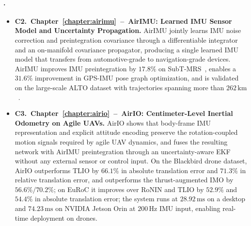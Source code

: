 \paragraph{\partIITitle.}
\begin{itemize}
    \item \textbf{C2.~Chapter~\ref{chapter:airimu}~--~AirIMU: Learned IMU Sensor Model and Uncertainty Propagation.}
    AirIMU jointly learns IMU noise correction and preintegration covariance through a differentiable integrator and an on-manifold covariance propagator, producing a single learned IMU model that transfers from automotive-grade to navigation-grade devices.
    AirIMU improves IMU preintegration by $17.8\%$ on SubT-MRS~\cite{zhao2023subt}, enables a $31.6\%$ improvement in GPS-IMU pose graph optimization, and is validated on the large-scale ALTO dataset with trajectories spanning more than $262\,\mathrm{km}$~\cite{qiu2023airimu}.

    \item \textbf{C3.~Chapter~\ref{chapter:airio}~--~AirIO: Centimeter-Level Inertial Odometry on Agile UAVs.}
    AirIO shows that body-frame IMU representation and explicit attitude encoding preserve the rotation-coupled motion signals required by agile UAV dynamics, and fuses the resulting network with AirIMU preintegration through an uncertainty-aware EKF without any external sensor or control input.
    On the Blackbird drone dataset, AirIO outperforms TLIO by $66.1\%$ in absolute translation error and $71.3\%$ in relative translation error, and outperforms the thrust-augmented IMO by $56.6\%/70.2\%$; on EuRoC it improves over RoNIN and TLIO by $52.9\%$ and $54.4\%$ in absolute translation error; the system runs at $28.92\,\mathrm{ms}$ on a desktop and $74.23\,\mathrm{ms}$ on NVIDIA Jetson Orin at $200\,\mathrm{Hz}$ IMU input, enabling real-time deployment on drones.
\end{itemize}

